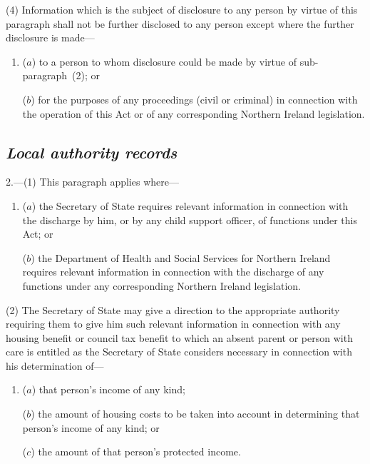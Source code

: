 \documentclass[12pt,a4paper]{article}
\begin{document}
(4) Information which is the subject of disclosure to any person by virtue of this paragraph shall not be further disclosed to any person except where the further disclosure is made—
\begin{enumerate}\item[]
($a$) to a person to whom disclosure could be made by virtue of sub-\hspace{0pt}paragraph~(2); or

($b$) for the purposes of any proceedings (civil or criminal) in connection with the operation of this Act or of any corresponding Northern Ireland legislation.
\end{enumerate}


\subsection*{\itshape Local authority records}

2.---(1) This paragraph applies where—
\begin{enumerate}\item[]
($a$) the Secretary of State requires relevant information in connection with the discharge by him, or by any child support officer, of functions under this Act; or

($b$) the Department of Health and Social Services for Northern Ireland requires relevant information in connection with the discharge of any functions under any corresponding Northern Ireland legislation.
\end{enumerate}

(2) The Secretary of State may give a direction to the appropriate authority requiring them to give him such relevant information in connection with any housing benefit or 
council tax benefit  %
to which an absent parent or person with care is entitled as the Secretary of State considers necessary in connection with his determination of—
\begin{enumerate}\item[]
($a$) that person’s income of any kind;

($b$) the amount of housing costs to be taken into account in determining that person’s income of any kind; or

($c$) the amount of that person’s protected income.
\end{enumerate}
\end{document}
